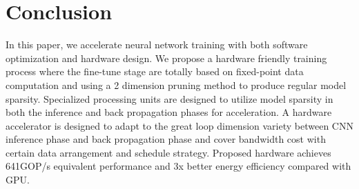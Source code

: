 \section{Conclusion}\label{sec:conclusion}

In this paper, we accelerate neural network training with both software optimization and hardware design. We propose a hardware friendly training process where the fine-tune stage are totally based on fixed-point data computation and using a 2 dimension pruning method to produce regular model sparsity. Specialized processing units are designed to utilize model sparsity in both the inference and back propagation phases for acceleration. A hardware accelerator is designed to adapt to the great loop dimension variety between CNN inference phase and back propagation phase and cover bandwidth cost with certain data arrangement and schedule strategy. Proposed hardware achieves 641GOP/s equivalent performance and 3x better energy efficiency compared with GPU. 
